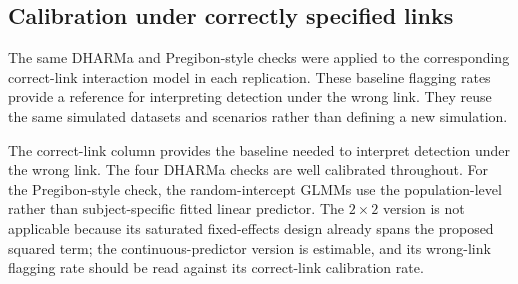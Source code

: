 \documentclass[
  man,
  floatsintext,
  longtable,
  nolmodern,
  notxfonts,
  notimes,
  colorlinks=true,linkcolor=blue,citecolor=blue,urlcolor=blue]{apa7}
\begin{document}
\subsection{Calibration under correctly specified
links}\label{calibration-under-correctly-specified-links}

The same DHARMa and Pregibon-style checks were applied to the
corresponding correct-link interaction model in each replication. These
baseline flagging rates provide a reference for interpreting detection
under the wrong link. They reuse the same simulated datasets and
scenarios rather than defining a new simulation.

The correct-link column provides the baseline needed to interpret
detection under the wrong link. The four DHARMa checks are well
calibrated throughout. For the Pregibon-style check, the
random-intercept GLMMs use the population-level rather than
subject-specific fitted linear predictor. The \(2 \times 2\) version is
not applicable because its saturated fixed-effects design already spans
the proposed squared term; the continuous-predictor version is
estimable, and its wrong-link flagging rate should be read against its
correct-link calibration rate.
\end{document}
